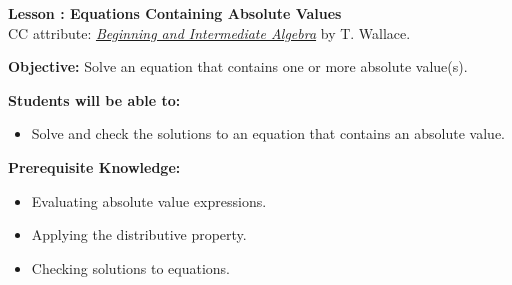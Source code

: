 \documentclass[12pt]{article}
\theoremstyle{definition}
\begin{document}
{\bf \large Lesson : Equations Containing Absolute Values}\label{les:equations_containing_absolute_values}
\\ CC attribute: \href{http://www.wallace.ccfaculty.org/book/book.html}{\it{Beginning and Intermediate Algebra}} by T. Wallace. 
\hfill \doclicenseImage[imagewidth=5em]\\
\par
{\bf Objective:} Solve an equation that contains one or more absolute value(s).\\
\par
{\bf Students will be able to:}
\begin{itemize}
	\item Solve and check the solutions to an equation that contains an absolute value.
\end{itemize}
{\bf Prerequisite Knowledge:}
\begin{itemize}
	\item Evaluating absolute value expressions.
	\item Applying the distributive property.
	\item Checking solutions to equations.
\end{itemize}
\hrulefill
\end{document}
